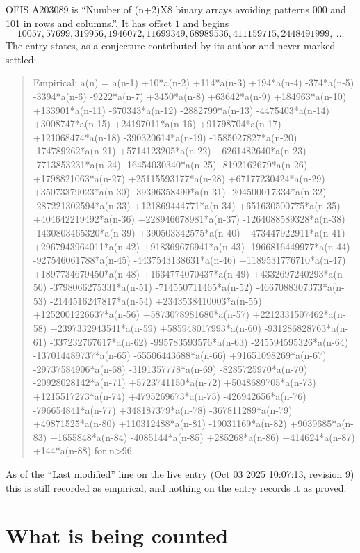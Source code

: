 \documentclass[11pt,a4paper]{article}
\theoremstyle{plain}
\theoremstyle{definition}
\begin{document}
OEIS A203089 is ``Number of (n+2)X8 binary arrays avoiding patterns 000 and 101 in rows and columns.''. It has offset $1$ and begins
\[
10057, 57699, 319956, 1946072, 11699349, 68989536, 411159715, 2448491999,\ \dots
\]
The entry states, as a conjecture contributed by its author and never marked settled:
\begin{quote}
Empirical: a(n) = a(n-1) +10*a(n-2) +114*a(n-3) +194*a(n-4) -374*a(n-5) -3394*a(n-6) -9222*a(n-7) +3450*a(n-8) +63642*a(n-9) +184963*a(n-10) +133901*a(n-11) -670343*a(n-12) -2882799*a(n-13) -4475403*a(n-14) +3008747*a(n-15) +24197011*a(n-16) +91798704*a(n-17) +121068474*a(n-18) -390320614*a(n-19) -1585027827*a(n-20) -174789262*a(n-21) +5714123205*a(n-22) +6261482640*a(n-23) -7713853231*a(n-24) -16454030340*a(n-25) -8192162679*a(n-26) +1798821063*a(n-27) +25115593177*a(n-28) +67177230424*a(n-29) +35073379023*a(n-30) -39396358499*a(n-31) -204500017334*a(n-32) -287221302594*a(n-33) +121869444771*a(n-34) +651630500775*a(n-35) +404642219492*a(n-36) +228946678981*a(n-37) -1264088589328*a(n-38) -1430803465320*a(n-39) +390503342575*a(n-40) +473447922911*a(n-41) +2967943964011*a(n-42) +918369676941*a(n-43) -1966816449977*a(n-44) -927546061788*a(n-45) -4437543138631*a(n-46) +1189531776710*a(n-47) +1897734679450*a(n-48) +1634774070437*a(n-49) +4332697240293*a(n-50) -3798066275331*a(n-51) -714550711465*a(n-52) -4667088307373*a(n-53) -2144516247817*a(n-54) +2343538410003*a(n-55) +1252001226637*a(n-56) +5873078981680*a(n-57) +2212331507462*a(n-58) +2397332943541*a(n-59) +585948017993*a(n-60) -931286828763*a(n-61) -337232767617*a(n-62) -995783593576*a(n-63) -245594595326*a(n-64) -137014489737*a(n-65) -65506443688*a(n-66) +91651098269*a(n-67) -29737584906*a(n-68) -3191357778*a(n-69) -8285725970*a(n-70) -20928028142*a(n-71) +5723741150*a(n-72) +5048689705*a(n-73) +1215517273*a(n-74) +4795269673*a(n-75) -426942656*a(n-76) -796654841*a(n-77) +348187379*a(n-78) -367811289*a(n-79) +49871525*a(n-80) +110312488*a(n-81) -19031169*a(n-82) +9039685*a(n-83) +1655848*a(n-84) -4085144*a(n-85) +285268*a(n-86) +414624*a(n-87) +144*a(n-88) for n>96
\end{quote}
As of the ``Last modified'' line on the live entry (Oct 03 2025 10:07:13, revision 9) this is still
recorded as empirical, and nothing on the entry records it as proved.

\section{What is being counted}
\end{document}
